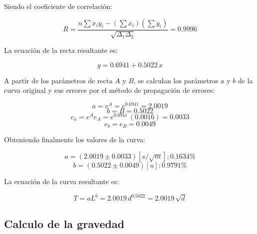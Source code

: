 \documentclass[letter,11pt]{article}
\begin{document}
Siendo el coeficiente de correlación:

\begin{equation*}
    R = \frac{n \sum x_i y_i - (\sum x_i)(\sum y_i)}{\sqrt{\Delta_1 \Delta_2}}
      = 0.9996
\end{equation*}
\vspace{0.10cm}

La ecuación de la recta resultante es:

\begin{equation*}
    y = 0.6941 + 0.5022\,x
\end{equation*}
\vspace{0.10cm}

A partir de los parámetros de recta $A$ y $B$, se calculan los parámetros $a$ y
$b$ de la curva original y sus errores por el método de propagación de errores:

\begin{equation*}
    a = e^{A} = e^{0.6941} = 2.0019
\end{equation*}
\begin{equation*}
    b = B = 0.5022
\end{equation*}
\begin{equation*}
    e_a = e^A e_A = e^{0.6941}\,(0.0016) = 0.0033
\end{equation*}
\begin{equation*}
    e_b = e_B = 0.0049
\end{equation*}
\vspace{0.10cm}

Obteniendo finalmente los valores de la curva:

\begin{equation*}
    a = (2.0019 \pm 0.0033) [s/\sqrt{m}]; 0.1634 \%
\end{equation*}
\begin{equation*}
    b = (0.5022 \pm 0.0049) [u]; 0.9791 \%
\end{equation*}
\vspace{0.10cm}

La ecuación de la curva resultante es:

\begin{equation*}
    T = a L^b = 2.0019\,d^{0.5022} = 2.0019\,\sqrt{d}
\end{equation*}
\vspace{0.10cm}

\subsection{Calculo de la gravedad}
\end{document}
